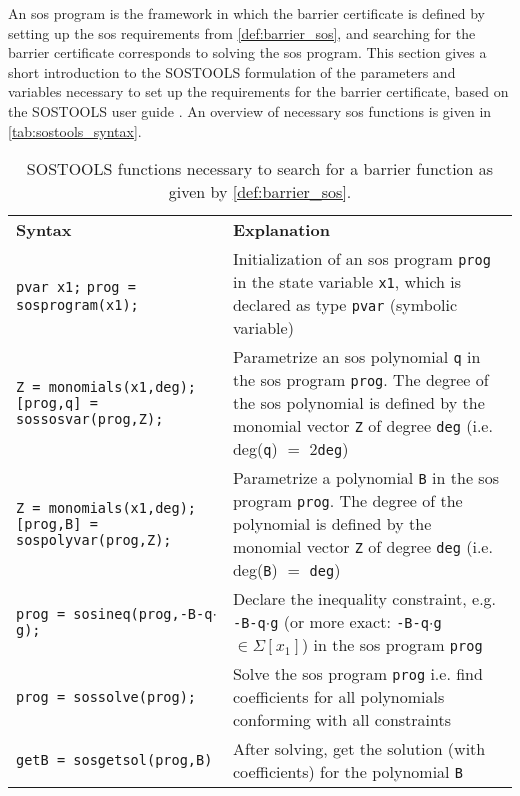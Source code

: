 An \gls{sos} program is the framework in which the barrier certificate is defined by setting up the  \gls{sos} requirements from \autoref{def:barrier_sos}, and searching for the barrier certificate corresponds to solving the \gls{sos} program.
This section gives a short introduction to the SOSTOOLS formulation of the parameters and variables necessary to set up the requirements for the barrier certificate, based on the SOSTOOLS user guide \citep{bib:sostools_manual}.  
An overview of necessary \gls{sos} functions is given in \autoref{tab:sostools_syntax}.
\vspace{2mm}
\begin{table}[htbp]
	\begin{tabularx}{\textwidth}{p{6cm} X}
		\rowcolor{HeaderBlue}
		\textbf{Syntax} & \textbf{Explanation}\\
		\texttt{pvar x1;}\newline
		\texttt{prog = sosprogram(x1);} & Initialization of an \gls{sos} program \texttt{prog} in the state variable \texttt{x1}, which is declared as  type \texttt{pvar} (symbolic variable)\\
		\rowcolor{textBlue} 
		\texttt{Z = monomials(x1,deg);}\newline
		\texttt{[prog,q] = sossosvar(prog,Z);} & Parametrize an \gls{sos} polynomial \texttt{q} in the \gls{sos} program \texttt{prog}. The degree of the \gls{sos} polynomial is defined by the monomial vector \texttt{Z} of degree \texttt{deg} (i.e. deg(\texttt{q}) $=$ 2\texttt{deg})\\
		\texttt{Z = monomials(x1,deg);}\newline
		\texttt{[prog,B] = sospolyvar(prog,Z);} & Parametrize a polynomial \texttt{B} in the \gls{sos} program \texttt{prog}. The degree of the  polynomial is defined by the monomial vector \texttt{Z} of degree \texttt{deg} (i.e. deg(\texttt{B}) $=$ \texttt{deg})\\
		\rowcolor{textBlue}
		\texttt{prog = sosineq(prog,-B-q$\cdot$g);} & Declare the inequality constraint, e.g. \texttt{-B-q$\cdot$g} (or more exact: \texttt{-B-q$\cdot$g} $\in\Sigma[x_1]$) in the \gls{sos} program \texttt{prog}\\
		\texttt{prog = sossolve(prog);} & Solve the \gls{sos} program \texttt{prog} i.e. find coefficients for all polynomials conforming with all constraints \\
		\rowcolor{textBlue}
		\texttt{getB = sosgetsol(prog,B)} & After solving, get the solution (with coefficients) for the polynomial \texttt{B}
	\end{tabularx}
	\caption{SOSTOOLS functions necessary to search for a barrier function as given by \autoref{def:barrier_sos}.}
	\label{tab:sostools_syntax}
\end{table}




